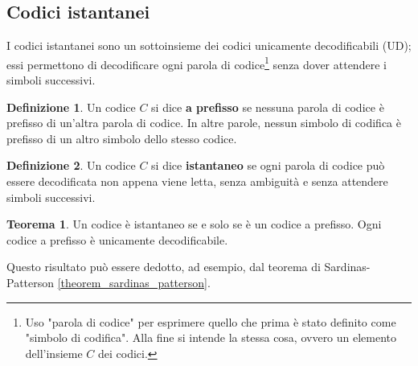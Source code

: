 \documentclass{article}
\theoremstyle{definition}
\newtheorem{theorem}{Teorema}[section] %
\newtheorem{definizione}{Definizione}[section]
\numberwithin{equation}{section}
\begin{document}
\subsection{Codici istantanei}
I codici istantanei sono un sottoinsieme dei codici unicamente decodificabili (UD); essi permettono di decodificare ogni parola di codice\footnote{Uso "parola di codice" per esprimere quello che prima è stato definito come "simbolo di codifica". Alla fine si intende la stessa cosa, ovvero un elemento dell'insieme $C$ dei codici.} senza dover attendere i simboli successivi.
\begin{definizione}
    Un codice $C$ si dice \textbf{a prefisso} se nessuna parola di codice è prefisso di un'altra parola di codice. In altre parole, nessun simbolo di codifica è prefisso di un altro simbolo dello stesso codice.
\end{definizione}
\begin{definizione}
    Un codice $C$ si dice \textbf{istantaneo} se ogni parola di codice può essere decodificata non appena viene letta, senza ambiguità e senza attendere simboli successivi.
\end{definizione}
\begin{theorem}
    Un codice è istantaneo se e solo se è un codice a prefisso. Ogni codice a prefisso è unicamente decodificabile.
\end{theorem}
Questo risultato può essere dedotto, ad esempio, dal teorema di Sardinas-Patterson \eqref{theorem_sardinas_patterson}.
\end{document}
